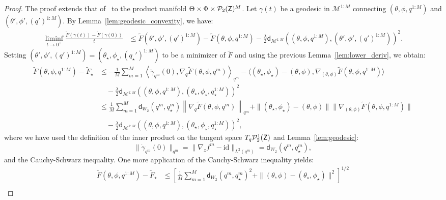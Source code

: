 \begin{proof}
    The proof extends that of~\citet[Theorem 6]{caprioerrorboundsparticle2024} to the product manifold $\Theta \times \Phi \times \mathcal{P}_2({\mathsf{Z}})^M$. Let $\gamma(t)$ be a geodesic in $\mathcal{M}^{1:M}$ connecting $(\theta, \phi, q^{1:M})$ and $(\theta', \phi', (q')^{1:M})$. By Lemma~\ref{lem:geodesic_convexity}, we have:
    \begin{align*}
        \liminf_{t \to 0^+} \frac{\tilde{F}(\gamma(t)) - \tilde{F}(\gamma(0))}{t} &\leq \tilde{F}(\theta', \phi', (q')^{1:M}) - \tilde{F}(\theta, \phi, q^{1:M}) - \frac{\lambda}{2}\mathsf{d}_{\mathcal{M}^{1:M}}((\theta, \phi, q^{1:M}), (\theta', \phi', (q')^{1:M}))^2.
    \end{align*}
    Setting $(\theta', \phi', (q')^{1:M})=(\theta_\star, \phi_\star, (q_\star')^{1:M})$ to be a minimizer of $\tilde{F}$ and using the previous Lemma~\ref{lem:lower_deriv}, we obtain:
    \begin{align*}
        \tilde{F}(\theta, \phi, q^{1:M}) - \tilde{F}_\star &\leq -\frac{1}{M} \sum_{m=1}^M \left\langle \dot{\gamma}_{q^m}(0), \nabla_q { \tilde{F}(\theta, \phi, q^m)} \right\rangle_{q^m} - \langle 
        (\theta_\star, \phi_\star) - (\theta, \phi), \nabla_{(\theta, \phi)} \tilde{F}(\theta, \phi, q^{1:M})
        \rangle \\
        &\quad - \frac{\lambda}{2}\mathsf{d}_{\mathcal{M}^{1:M}}((\theta, \phi, q^{1:M}), (\theta_\star, \phi_\star, q_\star^{1:M}))^2 \\
        &\leq \frac{1}{M} \sum_{m=1}^M \mathsf{d}_{W_2}(q^m, q_\star^m) \left\| \nabla_q {\tilde{F}(\theta, \phi, q^m)} \right\|_{q^m} + \|(\theta_\star, \phi_\star) - (\theta, \phi)\| \|\nabla_{(\theta, \phi)} \tilde{F}(\theta, \phi, q^{1:M})\| \\
        &\quad - \frac{\lambda}{2}\mathsf{d}_{\mathcal{M}^{1:M}}((\theta, \phi, q^{1:M}), (\theta_\star, \phi_\star, q_\star^{1:M}))^2,
    \end{align*}
    where we have used the definition of the inner product on the tangent space $T_q\mathcal{P}_2^1({\mathsf{Z}})$ and Lemma~\ref{lem:geodesic}:
    \begin{equation*}
        \|\dot{\gamma}_{q^m}(0)\|_{q^m}=\|\nabla_z f^m - \mathrm{id}\|_{L^2(q^m)}=\mathsf{d}_{W_2}(q^m, q_\star^m),
    \end{equation*}
    and the Cauchy-Schwarz inequality. One more application of the Cauchy-Schwarz inequality yields:
    \begin{align*}
        \tilde{F}(\theta, \phi, q^{1:M}) - \tilde{F}_\star &\leq \left[\frac{1}{M}\sum_{m=1}^M \mathsf{d}_{W_2}(q^m, q_\star^m)^2 + \|(\theta, \phi) - (\theta_\star, \phi_\star)\|^2\right]^{1/2} \\

\end{align*}
\end{proof}
